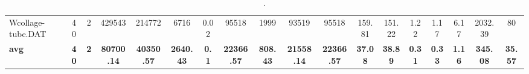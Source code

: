 \begin{sidewaystable}[h]
{\begin{tabular}{lccccccccccccccccc}
Wcollage-tube.DAT & 40 & 2 & 429543 & 214772 & 6716 & 0.02 & 95518 & 1999 & 93519 & 95518 & 159.81 & 151.22 & 1.22 & 1.17 & 6.17 & 2032.39 & 80\\
\cline{1-18} \textbf{avg} & \textbf{40} & \textbf{2} & \textbf{80700.14} & \textbf{40350.57} & \textbf{2640.43} & \textbf{0.1} & \textbf{22366.57} & \textbf{808.43} & \textbf{21558.14} & \textbf{22366.57} & \textbf{37.08} & \textbf{38.89} & \textbf{0.31} & \textbf{0.33} & \textbf{1.16} & \textbf{345.08} & \textbf{35.57} \\ \cline{1-18}
\bottomrule
\end{tabular}%
}%
\caption{.}
\label{tab:table_bc}
\end{sidewaystable}

